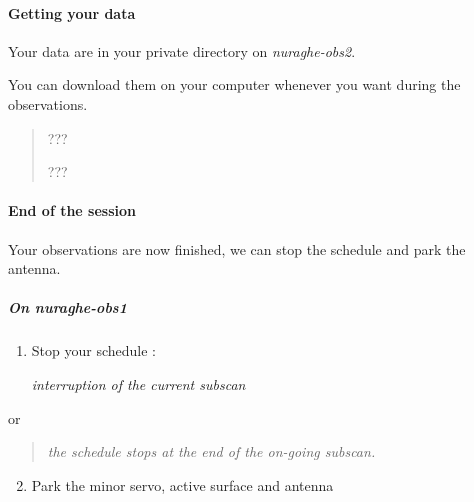 \documentclass[letterpaper,10pt,english]{sphinxmanual}
\begin{document}
\paragraph{Getting your data}
\label{Continuum/L-band/SARDARA/get-data:getting-your-data}\label{Continuum/L-band/SARDARA/get-data::doc}
Your data are in your private directory on \emph{nuraghe-obs2}.

You can download them on your computer whenever you want during the observations.
\begin{quote}

  ???

 ???
\end{quote}


\paragraph{End of the session}
\label{Continuum/L-band/SARDARA/stop-session:end-of-the-session}\label{Continuum/L-band/SARDARA/stop-session::doc}
Your observations are now finished, we can stop the schedule and park
the antenna.


\subparagraph{On nuraghe-obs1}
\label{Continuum/L-band/SARDARA/stop-session:on-nuraghe-obs1}\begin{enumerate}
\item {} 
Stop your schedule :

   \emph{interruption of the current subscan}

\end{enumerate}

or
\begin{quote}

    \emph{the schedule stops at the end of the on-going subscan.}
\end{quote}
\begin{enumerate}
\setcounter{enumi}{1}
\item {} 
Park the minor servo, active surface and antenna





\end{enumerate}
\end{document}
